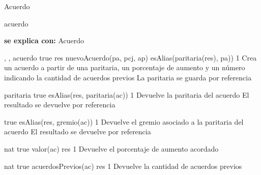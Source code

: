 \begin{interfaz}{Acuerdo}

\begin{iparamformales}{acuerdo}

\textbf{\large se explica con:} Acuerdo

\end{iparamformales}

{, , }{acuerdo}
{true}
{res \igobs nuevoAcuerdo(pa, pcj, ap) \land esAlias(paritaria(res), pa))}
{1}
{Crea un acuerdo a partir de una paritaria, un porcentaje de aumento y un n\'umero indicando la cantidad de acuerdos previos}
{La paritaria se guarda por referencia}

{}{paritaria}
{true}
{esAlias(res, paritaria(ac))}
{1}
{Devuelve la paritaria del acuerdo}
{El resultado se devuelve por referencia}

{true}
{esAlias(res, gremio(ac))}
{1}
{Devuelve el gremio asociado a la paritaria del acuerdo}
{El resultado se devuelve por referencia}

{}{nat}
{true}
{valor(ac) \igobs res}
{1}
{Devuelve el porcentaje de aumento acordado}
{}

{}{nat}
{true}
{acuerdosPrevios(ac) \igobs res}
{1}
{Devuelve la cantidad de acuerdos previos}
{}

\end{interfaz}